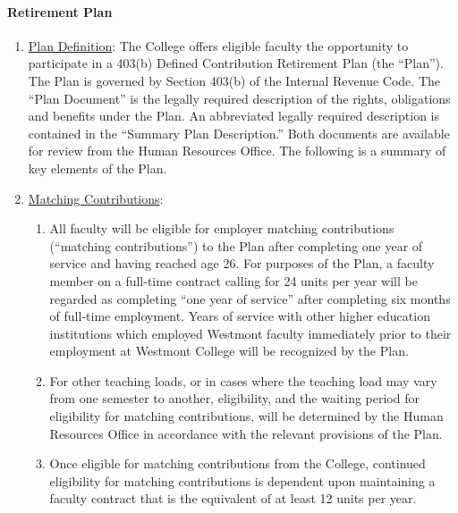 			\paragraph{Retirement Plan}
				\begin{enumerate}[label=\alph*)]

					\item{\underline{Plan Definition}:  The College offers eligible faculty the
						opportunity to participate in a 403(b) Defined Contribution
						Retirement Plan (the ``Plan'').  The Plan is governed by Section
						403(b) of the Internal Revenue Code.  The ``Plan Document'' is the
						legally required description of the rights, obligations and benefits
						under the Plan.  An abbreviated legally required description is
						contained in the ``Summary Plan Description.''  Both documents are
						available for review from the Human Resources Office.  The following
						is a summary of key elements of the Plan.}

					\item{\underline{Matching Contributions}:


						\begin{enumerate}[label=\arabic*)]

							\item{All faculty will be eligible for employer matching
								contributions (``matching contributions'') to the Plan after
								completing one year of service and having reached age 26.  For
								purposes of the Plan, a faculty member on a full-time contract
								calling for 24 units per year will be regarded as completing
								``one year of service'' after completing six months of full-time
								employment.  Years of service with other higher education
								institutions which employed Westmont faculty immediately prior
								to their employment at Westmont College will be recognized by
								the Plan.}

							\item{For other teaching loads, or in cases where the teaching
								load may vary from one semester to another, eligibility, and the
								waiting period for eligibility for matching contributions, will
								be determined by the Human Resources Office in accordance with
								the relevant provisions of the Plan.}

							\item{Once eligible for matching contributions from
								the College, continued eligibility for matching
								contributions is dependent upon maintaining a
								faculty contract that is the equivalent of at least
								12 units per year.  }


\end{enumerate}}
\end{enumerate}
